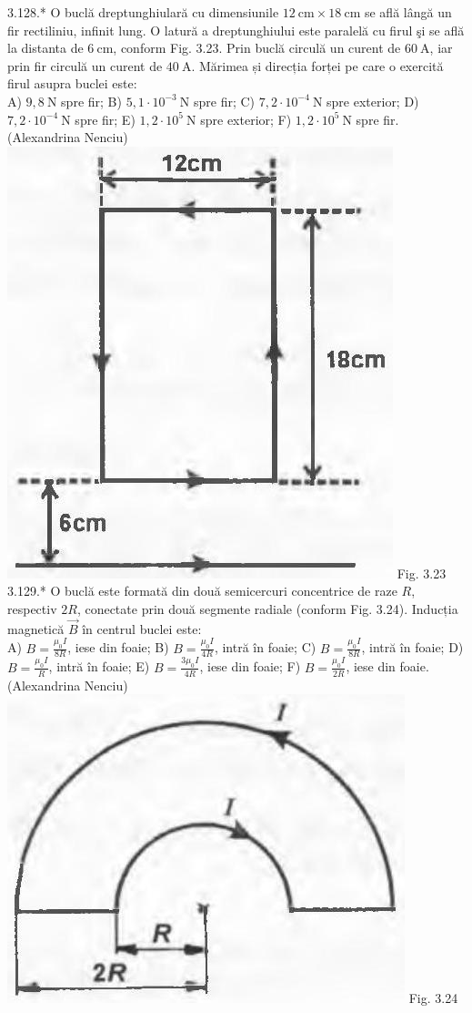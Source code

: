 3.128.* O buclă dreptunghiulară cu dimensiunile $12 \mathrm{~cm} \times 18 \mathrm{~cm}$ se află lângă un fir rectiliniu, infinit lung. O latură a dreptunghiului este paralelă cu firul şi se află la distanta de $6 \mathrm{~cm}$, conform Fig. 3.23. Prin buclă circulă un curent de $60 \mathrm{~A}$, iar prin fir circulă un curent de $40 \mathrm{~A}$. Mărimea și direcția forței pe care o exercită firul asupra buclei este:\\ A) $9,8 \mathrm{~N}$ spre fir; B) $5,1 \cdot 10^{-3} \mathrm{~N}$ spre fir; C) $7,2 \cdot 10^{-4} \mathrm{~N}$ spre exterior; D) $7,2 \cdot 10^{-4} \mathrm{~N}$ spre fir; E) $1,2 \cdot 10^{5} \mathrm{~N}$ spre exterior; F) $1,2 \cdot 10^{5} \mathrm{~N}$ spre fir.\\ (Alexandrina Nenciu)\\ \includegraphics[width=0.4\linewidth]{images/2025_07_01_5b3ff9fa0d508c8e9f17g-171(1)} Fig. 3.23\\

3.129.* O buclă este formată din două semicercuri concentrice de raze $R$, respectiv $2 R$, conectate prin două segmente radiale (conform Fig. 3.24). Inducția magnetică $\vec{B}$ în centrul buclei este:\\ A) $B=\frac{\mu_{0} I}{8 R}$, iese din foaie; B) $B=\frac{\mu_{0} I}{4 R}$, intră în foaie; C) $B=\frac{\mu_{0} I}{8 R}$, intră în foaie; D) $B=\frac{\mu_{0} I}{R}$, intră în foaie; E) $B=\frac{3 \mu_{0} I}{4 R}$, iese din foaie; F) $B=\frac{\mu_{0} I}{2 R}$, iese din foaie.\\ (Alexandrina Nenciu)\\ \includegraphics[width=0.4\linewidth]{images/2025_07_01_5b3ff9fa0d508c8e9f17g-171(2)} Fig. 3.24\\

